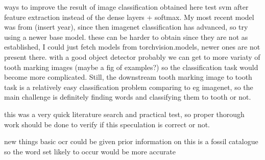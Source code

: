 \documentclass{article}
\begin{document}
ways to improve the result of image classification obtained here 
test svm after feature extraction instead of the dense layers + softmax. My most recent model was from (insert year),
since then imagenet classification has advanced, so try using a newer base model. these can be harder to obtain 
since they are not as established, I could just fetch models from torchvision.models, newer ones are not present there.
with a good object detector probably we can get to more variaty of tooth marking images (maybe a fig of examples?)
so the classification task would become more complicated. Still, the downstream tooth marking image to tooth task 
is a relatively easy classification problem comparing to eg imagenet, so the main challenge is definitely finding words and
classifying them to tooth or not.

this was a very quick literature search and practical test, so proper thorough work should be done to verify if this speculation 
is correct or not.

new things
basic ocr could be given prior information on this is a fossil catalogue so the word set likely to occur would be more accurate

\printbibliography
\end{document}
